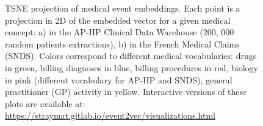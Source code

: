 \documentclass[french,12pt,twoside,a4paper]{book}
\begin{document}
\begin{appendices}
\begin{figure}[h]
    \caption{TSNE projection of medical event embeddings. Each point is a
      projection in 2D of the embedded vector for a given medical concept: a) in
      the AP-HP Clinical Data Warehouse (200, 000 random patients extractions), b)
      in the French Medical Claims (SNDS). Colors correspond to different medical
      vocabularies: drugs in green, billing diagnoses in blue, billing procedures
      in red, biology in pink (different vocabulary for AP-HP and SNDS), general
      practitioner (GP) activity in yellow. Interactive versions of these plots
      are available at:
      \url{https://straymat.gitlab.io/event2vec/visualizations.html}}
    \label{tsne_plots}
  \end{figure}

  \begin{table}
\end{table}
\end{appendices}
\end{document}
